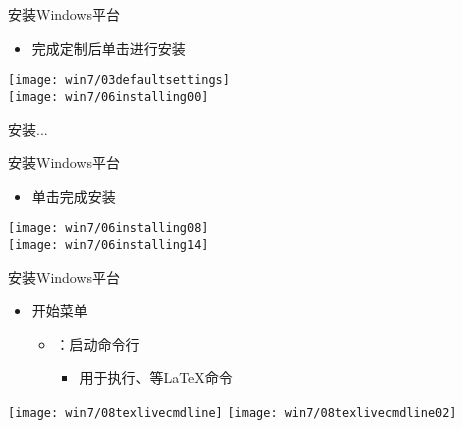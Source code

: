 \documentclass[fontset = none, t]{ctexbeamer}
\begin{document}
\begin{frame}{安装\tl}{Windows平台}
  \begin{spacing}{1.0}
    \begin{itemize}
    \item 完成定制后单击进行\tl 安装
    \end{itemize}  
    \begin{center}
      \texttt{[image: win7/03defaultsettings]}\\
      \texttt{[image: win7/06installing00]}
    \end{center}
  \end{spacing}
\end{frame}

\begin{frame}
  安装...
\end{frame}

\begin{frame}{安装\tl}{Windows平台}
  \begin{spacing}{1.0}
    \begin{itemize}
    \item 单击完成\tl 安装
    \end{itemize}  
    \begin{center}
      \texttt{[image: win7/06installing08]}\\
      \texttt{[image: win7/06installing14]}
    \end{center}
  \end{spacing}
\end{frame}

\begin{frame}{安装\tl}{Windows平台}
  \begin{spacing}{1.2}
    \begin{itemize}
    \item \keys{\tl}开始菜单
      \begin{itemize}
      \item {}：启动命令行
        \begin{itemize}
        \item 用于执行、等\LaTeX 命令
        \end{itemize}
      \end{itemize}
    \end{itemize}  
    \begin{center}
      \texttt{[image: win7/08texlivecmdline]}
      \texttt{[image: win7/08texlivecmdline02]}
    \end{center}
  \end{spacing}
\end{frame}
\end{document}
